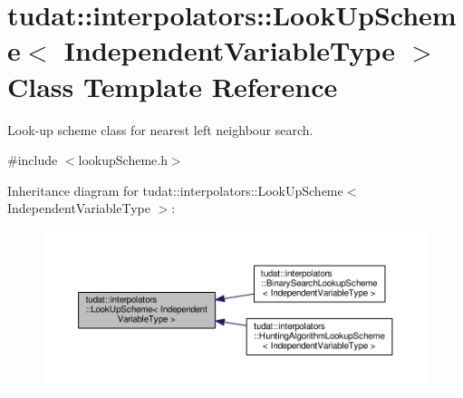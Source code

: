 \hypertarget{classtudat_1_1interpolators_1_1LookUpScheme}{}\section{tudat\+:\+:interpolators\+:\+:Look\+Up\+Scheme$<$ Independent\+Variable\+Type $>$ Class Template Reference}
\label{classtudat_1_1interpolators_1_1LookUpScheme}


Look-\/up scheme class for nearest left neighbour search.  




{\ttfamily \#include $<$lookup\+Scheme.\+h$>$}



Inheritance diagram for tudat\+:\+:interpolators\+:\+:Look\+Up\+Scheme$<$ Independent\+Variable\+Type $>$\+:
\nopagebreak
\begin{figure}[H]
\begin{center}
\leavevmode
\includegraphics[width=350pt]{classtudat_1_1interpolators_1_1LookUpScheme__inherit__graph}
\end{center}
\end{figure}
